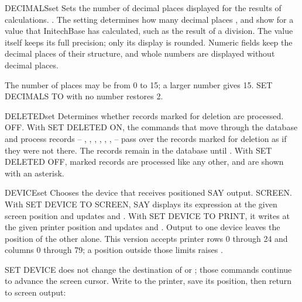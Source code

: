 \begin{XbaseEntry}{DECIMALS}{set}
Sets the number of decimal places displayed for the results of calculations.
\Syntax
{}
.
\Usage
The setting determines how many decimal places ,  and
 show for a value that InitechBase has calculated, such as the
result of a division.  The value itself keeps its full precision; only its
display is rounded.  Numeric fields keep the decimal places of their
structure, and whole numbers are displayed without decimal places.

The number of places may be from 0 to 15; a larger number gives 15.  SET
DECIMALS TO with no number restores 2.
\Examples
{}
\end{XbaseEntry}

\begin{XbaseEntry}{DELETED}{set}
Determines whether records marked for deletion are processed.
\Syntax
{}
\Defaults
OFF.
\Usage
With SET DELETED ON, the commands that move through the database and process
records -- , , , ,
, ,  -- pass over the records marked for
deletion as if they were not there.  The records remain in the database until
.  With SET DELETED OFF, marked records are processed like any
other, and are shown with an asterisk.
\Examples
{}
\end{XbaseEntry}

\begin{XbaseEntry}{DEVICE}{set}
Chooses the device that receives positioned SAY output.
\Syntax
{}
\Defaults
SCREEN.
\Usage
With SET DEVICE TO SCREEN,  SAY displays its expression at the given
screen position and updates  and .  With SET DEVICE TO
PRINT, it writes at the given printer position and updates  and
.  Output to one device leaves the position of the other alone.
This version accepts printer rows 0 through 24 and columns 0 through 79;
a position outside those limits raises
.

SET DEVICE does not change the destination of  or ; those
commands continue to advance the screen cursor.
\Examples
Write to the printer, save its position, then return to screen output:
\end{XbaseEntry}

